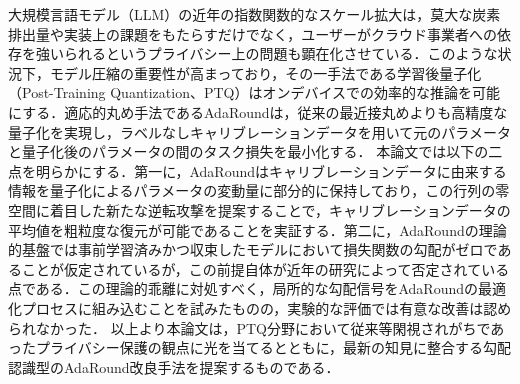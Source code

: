 \documentclass[../main.tex]{subfiles}
\begin{document}
\begin{eabstract}
大規模言語モデル（LLM）の近年の指数関数的なスケール拡大は，莫大な炭素排出量や実装上の課題をもたらすだけでなく，ユーザーがクラウド事業者への依存を強いられるというプライバシー上の問題も顕在化させている．このような状況下，モデル圧縮の重要性が高まっており，その一手法である学習後量子化（Post-Training Quantization、PTQ）はオンデバイスでの効率的な推論を可能にする．適応的丸め手法であるAdaRoundは，従来の最近接丸めよりも高精度な量子化を実現し，ラベルなしキャリブレーションデータを用いて元のパラメータと量子化後のパラメータの間のタスク損失を最小化する．
本論文では以下の二点を明らかにする．第一に，AdaRoundはキャリブレーションデータに由来する情報を量子化によるパラメータの変動量に部分的に保持しており，この行列の零空間に着目した新たな逆転攻撃を提案することで，キャリブレーションデータの平均値を粗粒度な復元が可能であることを実証する．第二に，AdaRoundの理論的基盤では事前学習済みかつ収束したモデルにおいて損失関数の勾配がゼロであることが仮定されているが，この前提自体が近年の研究によって否定されている点である．この理論的乖離に対処すべく，局所的な勾配信号をAdaRoundの最適化プロセスに組み込むことを試みたものの，実験的な評価では有意な改善は認められなかった．
以上より本論文は，PTQ分野において従来等閑視されがちであったプライバシー保護の観点に光を当てるとともに，最新の知見に整合する勾配認識型のAdaRound改良手法を提案するものである．
\end{eabstract}

\begin{abstract}
The recent exponential scaling of Large Language Models (LLMs) has resulted in massive carbon emissions and significant challenges in deployment, forcing users to rely on third-party cloud providers, thereby raising privacy concerns. This highlights the necessity of model compression, and post-training quantization (PTQ) is one method that enables efficient on-device models. AdaRound, an adaptive rounding method that outperforms round-to-nearest rounding during quantization, minimizes the task loss between the original weights and the quantized weights on unlabelled calibration data. We find that: 1) AdaRound leaks some information about its calibration data into the weight perturbation matrix, and we demonstrate this by proposing a novel inversion attack that targets the null space of this matrix to recover coarse representations of the original data. 2) The theoretical foundation of AdaRound asserts that the gradient of the loss function is zero for pretrained converged models, an assumption which is refuted by recent literature. To address this discrepancy, we attempted to reconcile this by incorporating local gradient signals into the AdaRound optimization process, but obtained neutral results on empirical evaluations. Therefore, this thesis highlights a frequently overlooked dimension in PTQ (privacy), and proposes a gradient-aware modification of AdaRound to better align the method with modern literature.
\end{abstract}
\end{document}
